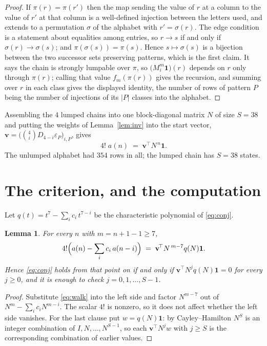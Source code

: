 \documentclass[11pt,a4paper]{article}
\theoremstyle{plain}
\newtheorem{lemma}[theorem]{Lemma}
\theoremstyle{definition}
\begin{document}
\begin{proof}
If $\pi(r)=\pi(r')$ then the map sending the value of $r$ at a column to the value of $r'$
at that column is a well-defined injection between the letters used, and extends to a
permutation $\sigma$ of the alphabet with $r'=\sigma(r)$. The edge condition is a statement
about equalities among entries, so $r\to s$ if and only if $\sigma(r)\to\sigma(s)$; and
$\pi(\sigma(s))=\pi(s)$. Hence $s\mapsto\sigma(s)$ is a bijection between the two successor
sets preserving patterns, which is the first claim. It says the chain is strongly lumpable
over $\pi$, so $\bigl(M_i^{m}\mathbf{1}\bigr)(r)$ depends on $r$ only through $\pi(r)$;
calling that value $f_m(\pi(r))$ gives the recursion, and summing over $r$ in each class
gives the displayed identity, the number of rows of pattern $P$ being the number of
injections of its $|P|$ classes into the alphabet.
\end{proof}

Assembling the $4$ lumped chains into one block-diagonal matrix $N$ of size $S=38$ and
putting the weights of Lemma~\ref{lem:inv} into the start vector,
$\mathbf{v}=\bigl(\binom{4}{i}D_{4-i}\varepsilon_P\bigr)_{i,P}$, gives
\begin{equation}\label{eq:walk}
4!\;a(n)\;=\;\mathbf{v}^{\!\top}N^{\,n}\mathbf{1} .
\end{equation}
The unlumped alphabet had $354$ rows in all; the lumped chain has $S=38$ states.

\section{The criterion, and the computation}

Let $q(t)=t^{7}-\sum_i c_i\,t^{7-i}$ be the characteristic polynomial of
\eqref{eq:conj}.

\begin{lemma}\label{lem:crit}
For every $n$ with $m=n+1-1\ge7$,
\[
4!\Bigl(a(n)-\sum_i c_i\,a(n-i)\Bigr)\;=\;\mathbf{v}^{\!\top}N^{\,m-7}q(N)\mathbf{1} .
\]
Hence \eqref{eq:conj} holds from that point on if and only if
$\mathbf{v}^{\!\top}N^{j}q(N)\mathbf{1}=0$ for every $j\ge0$, and it is enough to check
$j=0,1,\dots,S-1$.
\end{lemma}

\begin{proof}
Substitute \eqref{eq:walk} into the left side and factor $N^{m-7}$ out of
$N^{m}-\sum_i c_iN^{m-i}$. The scalar $4!$ is nonzero, so it does not affect whether
the left side vanishes. For the last clause put $w=q(N)\mathbf{1}$: by Cayley--Hamilton
$N^{S}$ is an integer combination of $I,N,\dots,N^{S-1}$, so each
$\mathbf{v}^{\!\top}N^{j}w$ with $j\ge S$ is the corresponding combination of earlier
values.
\end{proof}
\end{document}
